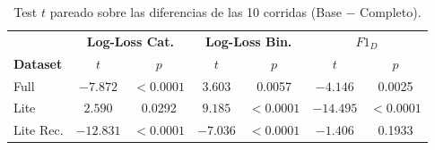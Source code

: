 \begin{table}[htbp]
    \centering
    \caption{Test $t$ pareado sobre las diferencias de las 10 corridas (Base $-$ Completo).}
    \label{tab:test_t}
    \begin{tabular}{lcccccc}
        \toprule
        & \multicolumn{2}{c}{\textbf{Log-Loss Cat.}} & \multicolumn{2}{c}{\textbf{Log-Loss Bin.}} & \multicolumn{2}{c}{\textbf{$F1_D$}} \\
        \textbf{Dataset} & $t$ & $p$ & $t$ & $p$ & $t$ & $p$ \\
        \midrule
        Full & $-7.872$ & $<0.0001$ & $3.603$ & 0.0057 & $-4.146$ & 0.0025 \\
        Lite & $2.590$ & 0.0292 & $9.185$ & $<0.0001$ & $-14.495$ & $<0.0001$ \\
        Lite Rec. & $-12.831$ & $<0.0001$ & $-7.036$ & $<0.0001$ & $-1.406$ & 0.1933 \\
        \bottomrule
    \end{tabular}
\end{table}